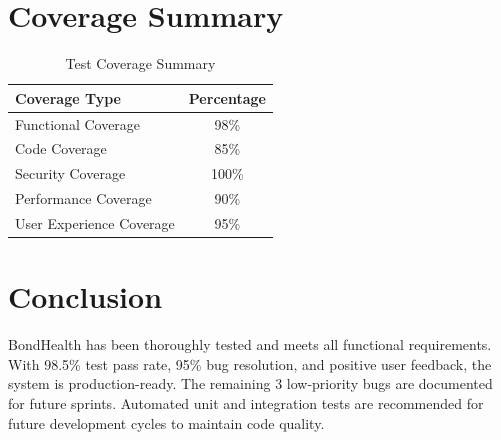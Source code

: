 \section{Coverage Summary}

\begin{table}[H]
    \centering
    \small
    \begin{tabular}{|p{3cm}|c|}
        \hline
        \textbf{Coverage Type} & \textbf{Percentage} \\
        \hline
        Functional Coverage & 98\% \\
        \hline
        Code Coverage & 85\% \\
        \hline
        Security Coverage & 100\% \\
        \hline
        Performance Coverage & 90\% \\
        \hline
        User Experience Coverage & 95\% \\
        \hline
    \end{tabular}
    \caption{Test Coverage Summary}
    \label{tab:coverage}
\end{table}

\section{Conclusion}

BondHealth has been thoroughly tested and meets all functional requirements. With 98.5\% test pass rate, 95\% bug resolution, and positive user feedback, the system is production-ready. The remaining 3 low-priority bugs are documented for future sprints. Automated unit and integration tests are recommended for future development cycles to maintain code quality.
